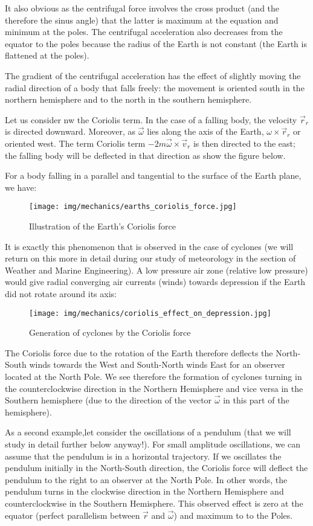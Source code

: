 	It also obvious as the centrifugal force involves the cross product (and the therefore the sinus angle) that the latter is maximum at the equation and minimum at the poles. The centrifugal acceleration also decreases from the equator to the poles because the radius of the Earth is not constant (the Earth is flattened at the poles).
	
	\begin{tcolorbox}[title=Remark,colframe=black,arc=10pt]
	The gradient of the centrifugal acceleration has the effect of slightly moving the radial direction of a body that falls freely: the movement is oriented south in the northern hemisphere and to the north in the southern hemisphere.
	\end{tcolorbox}
	Let us consider nw the Coriolis term. In the case of a falling body, the velocity $\vec{r}_r$ is directed downward. Moreover, as $\vec{\omega}$ lies along the axis of the Earth, $\omega\times\vec{r}_r$ or oriented west. The term Coriolis term $-2m\vec{\omega}\times\vec{v}_r$ is then directed to the east; the falling body will be deflected in that direction as show the figure below.
	
	For a body falling in a parallel and tangential to the surface of the Earth plane, we have:
	\begin{figure}[H]
		\centering
		\texttt{[image: img/mechanics/earths\_coriolis\_force.jpg]}
		\caption{Illustration of the Earth's Coriolis force}
	\end{figure}
	It is exactly this phenomenon that is observed in the case of cyclones (we will return on this more in detail during our study of meteorology in the section of Weather and Marine Engineering). A low pressure air zone (relative low pressure) would give radial converging air currents (winds) towards depression if the Earth did not rotate around its axis:
	\begin{figure}[H]
		\centering
		\texttt{[image: img/mechanics/coriolis\_effect\_on\_depression.jpg]}
		\caption{Generation of cyclones by the Coriolis force}
	\end{figure}
	The Coriolis force due to the rotation of the Earth therefore deflects the North-South winds towards the West and South-North winds East for an observer located at the North Pole. We see therefore the formation of cyclones turning in the counterclockwise direction in the Northern Hemisphere and vice versa in the Southern hemisphere (due to the direction of the vector $\vec{\omega}$ in this part of the hemisphere).
	
	As a second example,let  consider the oscillations of a pendulum (that we will study in detail further below anyway!). For small amplitude oscillations, we can assume that the pendulum is in a horizontal trajectory. If we oscillates the pendulum initially in the North-South direction, the Coriolis force will deflect the pendulum to the right to an observer at the North Pole. In other words, the pendulum turns in the clockwise direction  in the Northern Hemisphere and counterclockwise in the Southern Hemisphere. This observed effect is zero at the equator (perfect parallelism between $\vec{r}$ and $\vec{\omega}$) and maximum to to the Poles.
	
